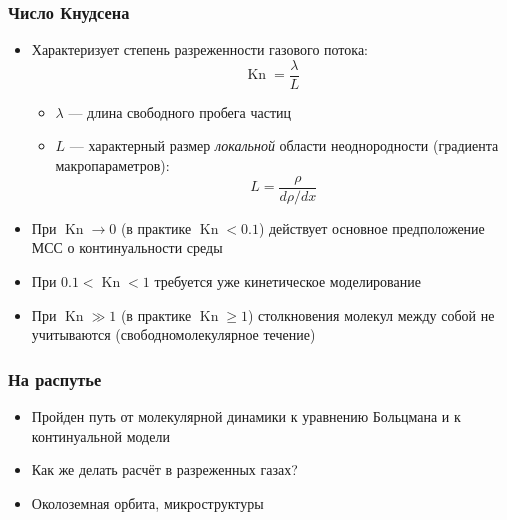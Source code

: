 \documentclass[onlymath]{beamer}
\renewcommand\geq\geqslant
\DeclareMathOperator\Kn{Kn}
\begin{document}
\begin{frame}
  \frametitle{Число Кнудсена}

  \begin{itemize}
  \item Характеризует степень разреженности газового потока:
    \begin{equation*}
      \Kn = \frac{\lambda}{L}
    \end{equation*}
    \begin{itemize}
    \item $\lambda$ — длина свободного пробега частиц
    \item $L$ — характерный размер \emph{локальной} области
      неоднородности (градиента макропараметров):
      \begin{equation*}
        L = \frac{\rho}{d\rho / dx}
      \end{equation*}
    \end{itemize}

  \item При $\Kn \to 0$ (в практике $\Kn < 0.1$) действует основное
    предположение МСС о континуальности среды
  \item При $0.1 < \Kn < 1$ требуется уже кинетическое моделирование
  \item При $\Kn \gg 1$ (в практике $\Kn \geq 1$) столкновения молекул
    между собой не учитываются (свободномолекулярное течение)
  \end{itemize}
\end{frame}

\begin{frame}
  \frametitle{На распутье}
  \begin{itemize}
  \item Пройден путь от молекулярной динамики к уравнению Больцмана и
    к континуальной модели
  \item Как же делать расчёт в разреженных газах?
  \item Околоземная орбита, микроструктуры
  \end{itemize}
\end{frame}
\end{document}
